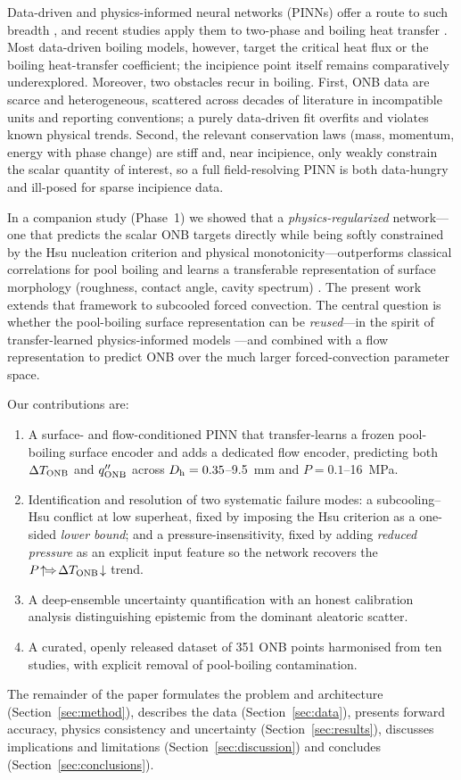 Data-driven and physics-informed neural networks (PINNs) offer a route to such
breadth \cite{CAI2021, JIN2021}, and recent studies apply them to two-phase and
boiling heat transfer \cite{JALILI2024a, VIDHYARTHI2025}. Most data-driven
boiling models, however, target the critical heat flux or the boiling
heat-transfer coefficient; the incipience point itself remains comparatively
underexplored. Moreover, two obstacles recur in boiling. First, ONB data are scarce and
heterogeneous, scattered across decades of literature in incompatible units and
reporting conventions; a purely data-driven fit overfits and violates known
physical trends. Second, the relevant conservation laws (mass, momentum, energy
with phase change) are stiff and, near incipience, only weakly constrain the
scalar quantity of interest, so a full field-resolving PINN is both
data-hungry and ill-posed for sparse incipience data.

In a companion study (Phase~1) we showed that a \emph{physics-regularized}
network---one that predicts the scalar ONB targets directly while being
softly constrained by the Hsu nucleation criterion and physical
monotonicity---outperforms classical correlations for pool boiling and learns a
transferable representation of surface morphology (roughness, contact angle,
cavity spectrum) \cite{JAFARI2016, VONTAS2021}. The present work extends that
framework to subcooled forced convection. The central question is whether the
pool-boiling surface representation can be \emph{reused}---in the spirit of
transfer-learned physics-informed models \cite{PRANTIKOS2023, JALILI2024b}---and
combined with a flow representation to predict ONB over the much larger
forced-convection parameter space.

Our contributions are:
\begin{enumerate}
\item A surface- and flow-conditioned PINN that transfer-learns a frozen
pool-boiling surface encoder and adds a dedicated flow encoder, predicting both
$\Delta T_{\mathrm{ONB}}$ and $q''_{\mathrm{ONB}}$ across $D_{\mathrm{h}} = 0.35$--\SI{9.5}{mm} and
$P = 0.1$--\SI{16}{MPa}.
\item Identification and resolution of two systematic failure modes: a
subcooling--Hsu conflict at low superheat, fixed by imposing the Hsu criterion
as a one-sided \emph{lower bound}; and a pressure-insensitivity, fixed by adding
\emph{reduced pressure} as an explicit input feature so the network recovers the
$P\!\uparrow\!\Rightarrow\!\Delta T_{\mathrm{ONB}}\!\downarrow$ trend.
\item A deep-ensemble uncertainty quantification with an honest calibration
analysis distinguishing epistemic from the dominant aleatoric scatter.
\item A curated, openly released dataset of 351 ONB points harmonised from ten
studies, with explicit removal of pool-boiling contamination.
\end{enumerate}

The remainder of the paper formulates the problem and architecture
(Section~\ref{sec:method}), describes the data (Section~\ref{sec:data}),
presents forward accuracy, physics consistency and uncertainty
(Section~\ref{sec:results}), discusses implications and limitations
(Section~\ref{sec:discussion}) and concludes (Section~\ref{sec:conclusions}).
